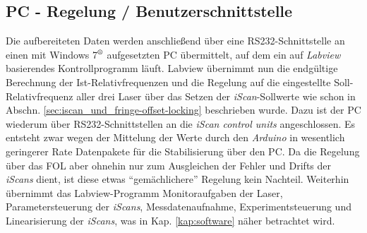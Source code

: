 \subsection{PC - Regelung /
Benutzerschnittstelle}\label{subsec:pc_regelung_benutzerschnittstelle} Die
aufbereiteten Daten werden anschließend über eine RS232-Schnittstelle an einen mit Windows
7$^\text{\textregistered}$ aufgesetzten PC übermittelt, auf dem ein auf
\textit{Labview} basierendes Kontrollprogramm läuft. Labview übernimmt nun die endgültige Berechnung der
Ist-Relativfrequenzen und die Regelung auf die eingestellte Soll-Relativfrequenz
aller drei Laser über das Setzen der \textit{iScan}-Sollwerte wie schon in
Abschn.
\ref{sec:iscan_und_fringe-offset-locking} beschrieben wurde.
Dazu ist der PC wiederum über RS232-Schnittstellen an die \textit{iScan control
units} angeschlossen. Es entsteht zwar wegen der Mittelung der Werte durch den
\textit{Arduino} in wesentlich geringerer Rate Datenpakete für die Stabilisierung über den PC. Da
die Regelung über das FOL aber ohnehin nur zum Ausgleichen der Fehler und Drifts
der \textit{iScans} dient, ist diese etwas "`gemächlichere"' Regelung kein
Nachteil.
Weiterhin übernimmt das Labview-Programm Monitoraufgaben der Laser,
Parametersteuerung der \textit{iScans}, Messdatenaufnahme, Experimentsteuerung
und Linearisierung der \textit{iScans}, was in Kap. \ref{kap:software} näher
betrachtet wird.\par

